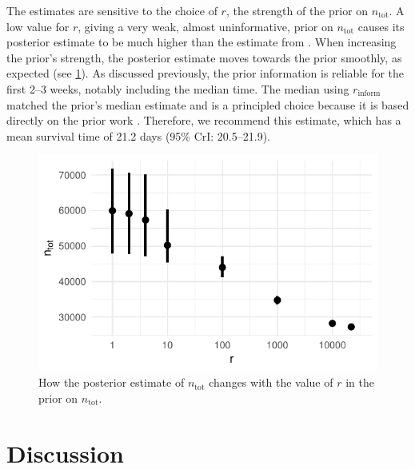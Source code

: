 \documentclass[12pt]{article}
\newcommand{\ntot}{n_\text{tot}}
\newcommand{\inform}{{_{\text{inform}}}}
\begin{document}
The estimates are sensitive to the choice of $r$, the strength of the prior on $\ntot$.
A low value for $r$, giving a very weak, almost uninformative, prior on $\ntot$ causes its posterior estimate to be much higher than the estimate from \citet{birrellRTM2}.
When increasing the prior's strength, the posterior estimate moves towards the prior smoothly, as expected (see \cref{imperf-test:fig:ntot}).
As discussed previously, the prior information is reliable for the first 2--3 weeks, notably including the median time.
The median using $r\inform$ matched the prior's median estimate and is a principled choice because it is based directly on the prior work \citet{birrellRTM2}.
Therefore, we recommend this estimate, which has a mean survival time of 21.2 days (95\% CrI: 20.5--21.9).
\begin{figure}
  \centering \includegraphics{figures/output/CIS_ntot}
  \caption[Sensitivity of $\ntot$'s posterior to its prior.]{How the posterior estimate of $\ntot$ changes with the value of $r$ in the prior on $\ntot$.}
  \label{imperf-test:fig:ntot}
\end{figure}


\section{Discussion} \label{sec:discussion}

\end{document}
